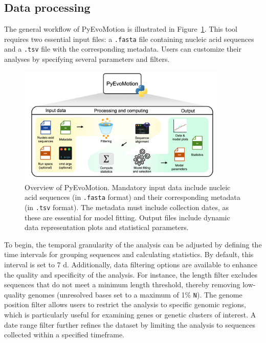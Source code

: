 \subsection{Data processing}
The general workflow of PyEvoMotion is illustrated in Figure~\ref{fig1:pyevomotion_overview}. This tool requires two essential input files: a \texttt{.fasta} file containing nucleic acid sequences and a \texttt{.tsv} file with the corresponding metadata. Users can customize their analyses by specifying several parameters and filters.
\begin{figure}[h!]
    \centering
    \includegraphics[trim={0 0.3cm 0 0},clip,width=0.9\textwidth]{assets/Ch3Fig1.png}
    \caption{Overview of PyEvoMotion. Mandatory input data include nucleic acid sequences (in \texttt{.fasta} format) and their corresponding metadata (in \texttt{.tsv} format). The metadata must include collection dates, as these are essential for model fitting. Output files include dynamic data representation plots and statistical parameters.}\label{fig1:pyevomotion_overview}
\end{figure}

To begin, the temporal granularity of the analysis can be adjusted by defining the time intervals for grouping sequences and calculating statistics. By default, this interval is set to 7 d. Additionally, data filtering options are available to enhance the quality and specificity of the analysis. For instance, the length filter excludes sequences that do not meet a minimum length threshold, thereby removing low-quality genomes (unresolved bases set to a maximum of 1\% \texttt{N}). The genome position filter allows users to restrict the analysis to specific genomic regions, which is particularly useful for examining genes or genetic clusters of interest. A date range filter further refines the dataset by limiting the analysis to sequences collected within a specified timeframe.

